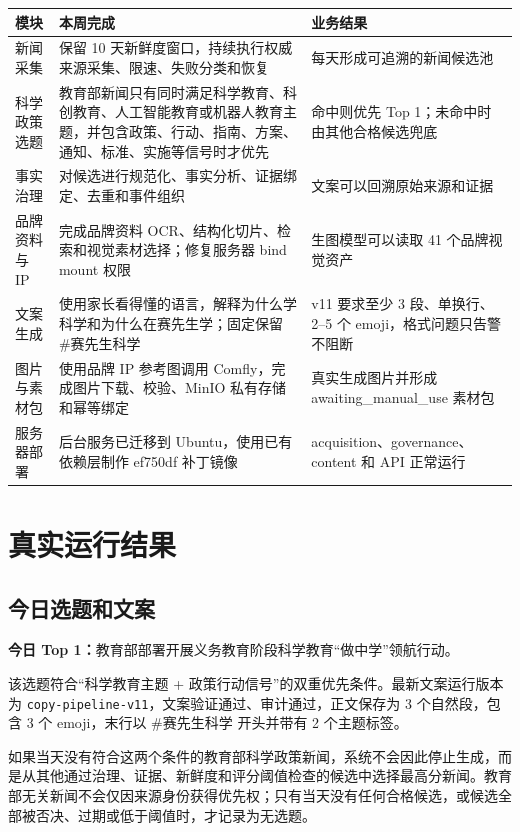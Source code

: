 \documentclass[UTF8,11pt,a4paper,fontset=none]{ctexart}
\begin{document}
\noindent\begin{tabularx}{\textwidth}{L{3.0cm}L{5.6cm}Y}
\toprule
{}
\color{white}\bfseries\sffamily 模块 &
\color{white}\bfseries\sffamily 本周完成 &
\color{white}\bfseries\sffamily 业务结果 \\
\midrule
新闻采集 & 保留 10 天新鲜度窗口，持续执行权威来源采集、限速、失败分类和恢复 & 每天形成可追溯的新闻候选池 \\
科学政策选题 & 教育部新闻只有同时满足科学教育、科创教育、人工智能教育或机器人教育主题，并包含政策、行动、指南、方案、通知、标准、实施等信号时才优先 & 命中则优先 Top 1；未命中时由其他合格候选兜底 \\
事实治理 & 对候选进行规范化、事实分析、证据绑定、去重和事件组织 & 文案可以回溯原始来源和证据 \\
品牌资料与 IP & 完成品牌资料 OCR、结构化切片、检索和视觉素材选择；修复服务器 bind mount 权限 & 生图模型可以读取 41 个品牌视觉资产 \\
文案生成 & 使用家长看得懂的语言，解释为什么学科学和为什么在赛先生学；固定保留 \#赛先生科学 & v11 要求至少 3 段、单换行、2--5 个 emoji，格式问题只告警不阻断 \\
图片与素材包 & 使用品牌 IP 参考图调用 Comfly，完成图片下载、校验、MinIO 私有存储和幂等绑定 & 真实生成图片并形成 awaiting\_manual\_use 素材包 \\
服务器部署 & 后台服务已迁移到 Ubuntu，使用已有依赖层制作 ef750df 补丁镜像 & acquisition、governance、content 和 API 正常运行 \\
\bottomrule
\end{tabularx}

\section{真实运行结果}

\subsection{今日选题和文案}

\begin{infobox}
\textbf{今日 Top 1：}教育部部署开展义务教育阶段科学教育“做中学”领航行动。

该选题符合“科学教育主题 + 政策行动信号”的双重优先条件。最新文案运行版本为
\texttt{copy-pipeline-v11}，文案验证通过、审计通过，正文保存为 3 个自然段，包含 3 个 emoji，末行以 \#赛先生科学 开头并带有 2 个主题标签。

如果当天没有符合这两个条件的教育部科学政策新闻，系统不会因此停止生成，而是从其他通过治理、证据、新鲜度和评分阈值检查的候选中选择最高分新闻。教育部无关新闻不会仅因来源身份获得优先权；只有当天没有任何合格候选，或候选全部被否决、过期或低于阈值时，才记录为无选题。
\end{infobox}
\end{document}
